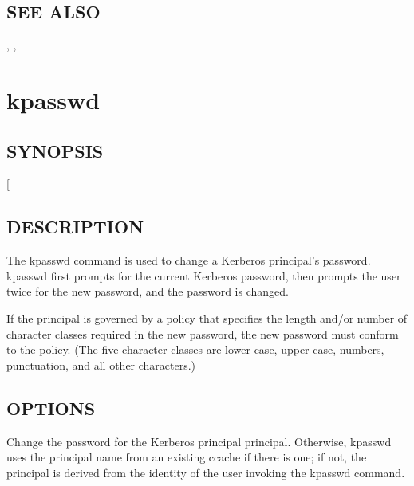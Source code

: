 \documentclass[letterpaper,10pt,english]{sphinxmanual}
\begin{document}
\subsection{SEE ALSO}
\label{\detokenize{user/user_commands/klist:see-also}}
\sphinxAtStartPar
{\hyperref[\detokenize{user/user_commands/kinit:kinit-1}]{}}, {\hyperref[\detokenize{user/user_commands/kdestroy:kdestroy-1}]{}}, {\hyperref[\detokenize{user/user_config/kerberos:kerberos-7}]{}}

\sphinxstepscope


\section{kpasswd}
\label{\detokenize{user/user_commands/kpasswd:kpasswd}}\label{\detokenize{user/user_commands/kpasswd:kpasswd-1}}\label{\detokenize{user/user_commands/kpasswd::doc}}

\subsection{SYNOPSIS}
\label{\detokenize{user/user_commands/kpasswd:synopsis}}
\sphinxAtStartPar
{} {[}\sphinxstyleemphasis{principal}{]}


\subsection{DESCRIPTION}
\label{\detokenize{user/user_commands/kpasswd:description}}
\sphinxAtStartPar
The kpasswd command is used to change a Kerberos principal’s password.
kpasswd first prompts for the current Kerberos password, then prompts
the user twice for the new password, and the password is changed.

\sphinxAtStartPar
If the principal is governed by a policy that specifies the length
and/or number of character classes required in the new password, the
new password must conform to the policy.  (The five character classes
are lower case, upper case, numbers, punctuation, and all other
characters.)


\subsection{OPTIONS}
\label{\detokenize{user/user_commands/kpasswd:options}}\begin{description}
\sphinxAtStartPar
Change the password for the Kerberos principal principal.
Otherwise, kpasswd uses the principal name from an existing ccache
if there is one; if not, the principal is derived from the
identity of the user invoking the kpasswd command.

\end{description}
\end{document}
